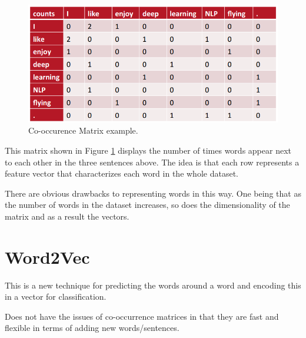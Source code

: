 \documentclass[12pt]{article}
\begin{document}
\begin{figure}[htbp!]
	\centering
	\includegraphics[scale=.4]{cooccurence.png}
	\caption{Co-occurence Matrix example.}
	\label{fig:cooccurence}
\end{figure}

This matrix shown in Figure \ref{fig:cooccurence} displays the number of times words appear next to each other in the three sentences above. The idea is that each row represents a feature vector that characterizes each word in the whole dataset.

There are obvious drawbacks to representing words in this way. One being that as the number of words in the dataset increases, so does the dimensionality of the matrix and as a result the vectors.

\section{Word2Vec}

This is a new technique \cite{word2vec} for predicting the words around a word and encoding this in a vector for classification.

Does not have the issues of co-occurrence matrices in that they are fast and flexible in terms of adding new words/sentences.

\newpage


\end{document}
